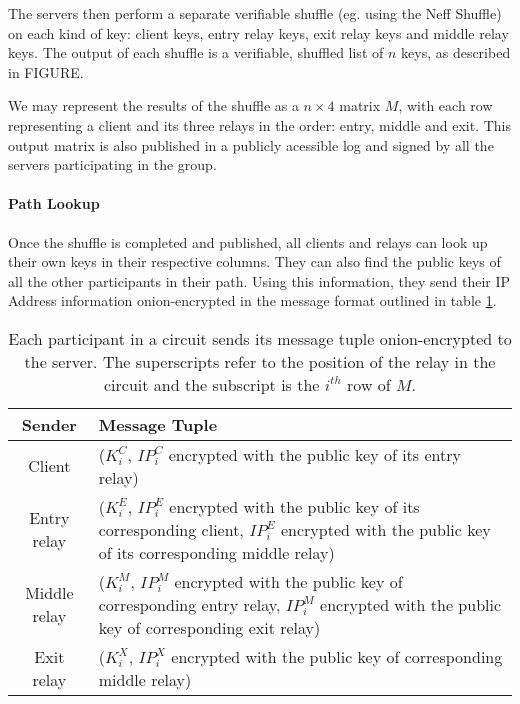 The servers then perform a separate verifiable shuffle (eg. using the Neff
Shuffle\cite{neff2001verifiable}) on each kind of key: client keys, entry relay
keys, exit relay keys and middle relay keys. The output of each shuffle is a
verifiable, shuffled list of $n$ keys, as described in FIGURE. 

We may represent the results of the shuffle as a $n \times 4$ matrix $M$, with
each row representing a client and its three relays in the order: entry, middle
and exit. This output matrix is also published in a publicly acessible log and
signed by all the servers participating in the group.

\paragraph{Path Lookup}
Once the shuffle is completed and published, all clients and relays can look up
their own keys in their respective columns. They can also find the public keys 
of all the other participants in their path. Using this information, they send 
their IP Address information onion-encrypted in the message format outlined in
table \ref{table:message_format}.

\begin{table}
  \begin{tabular}{ c || p{9cm} }
  \hline
  Sender & Message Tuple \\ \hline
  Client & ($K_{i}^{C}$, {$IP_{i}^{C}$ encrypted with the public key of its 
  entry relay}) \\ \hline
  Entry relay & ($K_{i}^{E}$, {$IP_{i}^{E}$ encrypted with the public key of 
  its corresponding client}, {$IP_{i}^{E}$ encrypted with the public key of 
  its corresponding middle relay}) \\ \hline
  Middle relay & ($K_{i}^{M}$, {$IP_{i}^{M}$ encrypted with the public key of 
  corresponding entry relay}, {$IP_{i}^{M}$ encrypted with the public key of 
  corresponding exit relay}) \\ \hline
  Exit relay & ($K_{i}^{X}$, {$IP_{i}^{X}$ encrypted with the public key of 
  corresponding middle relay}) \\ \hline
  \end{tabular}
  \caption{Each participant in a circuit sends its message 
  tuple onion-encrypted to the server. The superscripts refer to the position 
  of the relay in the circuit and the subscript is the $i^{th}$ row of $M$.}
  \label{table:message_format}
\end{table}

